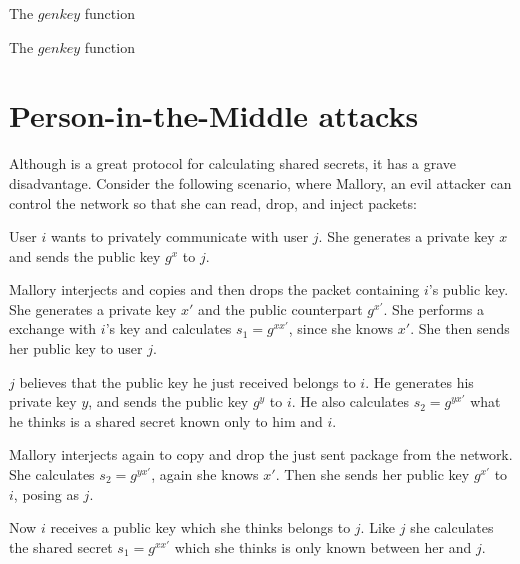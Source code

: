 \begin{algorithm}[h]
  \caption{The $genkey$ function}
  \label{algo:dh_genkey}
\end{algorithm}

\begin{algorithm}[h]
  \caption{The $genkey$ function}
  \label{algo:dh_calculate_secret}
\end{algorithm}

\section{Person-in-the-Middle attacks}

Although \dhname is a great protocol for calculating shared secrets, it has a grave disadvantage.
Consider the following scenario, where Mallory, an evil attacker can control the network so that she can read, drop, and inject packets:

User $i$ wants to privately communicate with user $j$.
She generates a private key $x$ and sends the public key $g^x$ to $j$.

Mallory interjects and copies and then drops the packet containing $i$'s public key.
She generates a private key $x\prime$ and the public counterpart $g^{x\prime}$.
She performs a \dhname exchange with $i$'s key and calculates $s_1 = g^{xx\prime}$, since she knows $x\prime$.
She then sends her public key to user $j$.

$j$ believes that the public key he just received belongs to $i$.
He generates his private key $y$, and sends the public key $g^y$ to $i$.
He also calculates $s_2 = g^{yx\prime}$ what he thinks is a shared secret known only to him and $i$.

Mallory interjects again to copy and drop the just sent package from the network.
She calculates $s_2 = g^{yx\prime}$, again she knows $x\prime$.
Then she sends her public key $g^{x\prime}$ to $i$, posing as $j$.

Now $i$ receives a public key which she thinks belongs to $j$.
Like $j$ she calculates the shared secret $s_1 = g^{xx\prime}$ which she thinks is only known between her and $j$.

